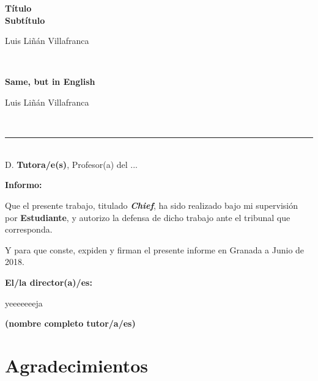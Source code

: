 \thispagestyle{empty}

\begin{center}
    {\large\bfseries Título \\ Subtítulo }\\
\end{center}
\begin{center}
    Luis Liñán Villafranca \\
\end{center}


\vspace{0.5cm}
\vspace{0.7cm}

\\

\cleardoublepage

\begin{center}
    {\large\bfseries Same, but in English}\\
\end{center}
\begin{center}
    Luis Liñán Villafranca\\
\end{center}
\vspace{0.5cm}
\vspace{0.7cm}

\\


\cleardoublepage

\thispagestyle{empty}

\noindent\rule[-1ex]{\textwidth}{2pt}\\[4.5ex]

D. \textbf{Tutora/e(s)}, Profesor(a) del ...

\vspace{0.5cm}

\textbf{Informo:}

\vspace{0.5cm}

Que el presente trabajo, titulado \textit{\textbf{Chief}},
ha sido realizado bajo mi supervisión por \textbf{Estudiante}, y autorizo la defensa de dicho trabajo ante el tribunal
que corresponda.

\vspace{0.5cm}

Y para que conste, expiden y firman el presente informe en Granada a Junio de 2018.

\vspace{1cm}

\textbf{El/la director(a)/es: }

\vspace{5cm}

yeeeeeeeja

\noindent\textbf{(nombre completo tutor/a/es)}

\chapter*{Agradecimientos}




